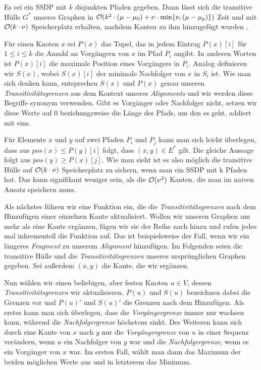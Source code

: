 \begin{satz}
	\label{satz:ssdp}
	Es sei ein SSDP mit $k$ disjunkten Pfaden gegeben. Dann lässt sich die transitive Hülle $G^*$ unseres Graphen in $\mathcal{O}(k^2\cdot(\mu - \mu_0) + \nu \cdot \min\{\nu, (\mu - \mu_p)\})$ Zeit und mit $\mathcal{O}(k\cdot \nu)$ Speicherplatz erhalten, nachdem Kanten zu ihm hinzugefügt wurden \citep{a97}.
\end{satz}

Für einen Knoten $x$ sei $P(x)$ das Tupel, das in jedem Eintrag $P(x)[i]$ für $1\leq i \leq k$ die Anzahl an Vorgängern von $x$ im Pfad $P_i$ angibt. In anderen Worten ist $P(x)[i]$ die maximale Position eines Vorgängers in $P_i$. Analog definieren wir $S(x)$, wobei  $S(x)[i]$ der minimale Nachfolger von $x$ in $S_i$ ist. Wie man sich denken kann, entsprechen $S(x)$ und $P(x)$ genau unseren \emph{Transitivitätsgrenzen} aus dem Kontext unseres \emph{Alignments} und wir werden diese Begriffe synonym verwenden. Gibt es Vorgänger oder Nachfolger nicht, setzen wir diese Werte auf 0 beziehungsweise die Länge des Pfads, um den es geht, addiert mit eins.

Für Elemente $x$ und $y$ auf zwei Pfaden $P_i$ und $P_j$ kann man sich leicht überlegen, dass aus $pos(x) \leq P(y)[i]$ folgt, dass $(x,y)\in E^*$ gilt. Die gleiche Aussage folgt aus $pos(y) \geq P(x)[j]$. Wie man sieht ist es also möglich die transitive Hülle auf $\mathcal{O}(k \cdot \nu)$ Speicherplatz zu sichern, wenn man ein SSDP mit k Pfaden hat. Das kann signifikant weniger sein, als die $\mathcal{O}(\nu^2)$ Kanten, die man im naiven Ansatz speichern muss.


Als nächstes führen wir eine Funktion ein, die die \emph{Transitivitätsgrenzen} nach dem Hinzufügen einer einzelnen Kante aktualisiert. Wollen wir unseren Graphen um mehr als eine Kante ergänzen, fügen wir sie der Reihe nach hinzu und rufen jedes mal inkrementell die Funktion auf. Das ist beispielsweise der Fall, wenn wir ein längeres \emph{Fragment} zu unserem \emph{Alignment} hinzufügen. Im Folgenden seien die transitive Hülle und die \emph{Transitivitätsgrenzen} unseres ursprünglichen Graphen gegeben. Sei außerdem $(x,y)$ die Kante, die wir ergänzen.

Nun wählen wir einen beliebigen, aber festen Knoten $u \in V$, dessen \emph{Transitivitätsgrenzen} wir aktualisieren. $P(u)$ und $S(u)$ bezeichnen dabei die Grenzen vor und $P(u)'$ und $S(u)'$ die Grenzen nach dem Hinzufügen. Als erstes kann man sich überlegen, dass die \emph{Vorgängergrenze} immer nur wachsen kann, während die \emph{Nachfolgergrenze} höchstens sinkt. Des Weiteren kann sich durch eine Kante von $x$ nach $y$ nur die \emph{Vorgängergrenze} von $u$ in einer Sequenz verändern, wenn $u$ ein Nachfolger von $y$ war und die \emph{Nachfolgergrenze}, wenn es ein Vorgänger von $x$ war. Im ersten Fall, wählt man dann das Maximum der beiden möglichen Werte aus und in letzterem das Minimum.  

